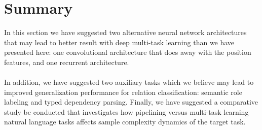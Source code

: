 \section{Summary}
In this section we have suggested two alternative neural network architectures that may lead to better result with deep multi-task learning than we have presented here: one convolutional architecture that does away with the position features, and one recurrent architecture.
\\\\
 In addition, we have suggested two auxiliary tasks which we believe may lead to improved generalization performance for relation classification: semantic role labeling and typed dependency parsing. Finally, we have suggested a comparative study be conducted that investigates how pipelining versus multi-task learning natural language tasks affects sample complexity dynamics of the target task.